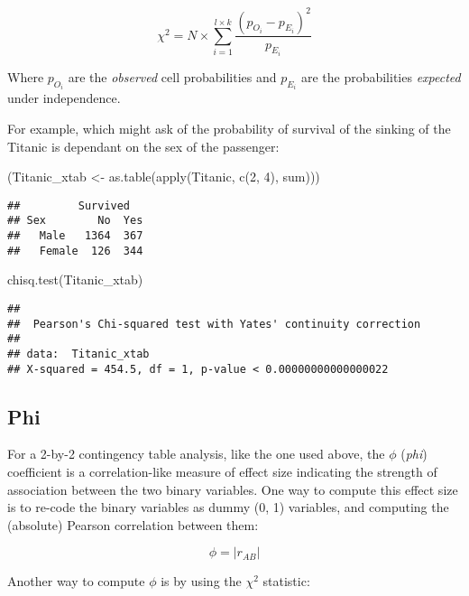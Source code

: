 \documentclass[
]{article}
\newenvironment{Shaded}{\begin{snugshade}}{\end{snugshade}}
\newcommand{\DecValTok}[1]{\textcolor[rgb]{0.00,0.00,0.81}{#1}}
\newcommand{\FunctionTok}[1]{\textcolor[rgb]{0.00,0.00,0.00}{#1}}
\newcommand{\NormalTok}[1]{#1}
\newcommand{\OtherTok}[1]{\textcolor[rgb]{0.56,0.35,0.01}{#1}}
\begin{document}
\[
\chi^2 = N\times\sum_{i=1}^{l\times k}{\frac{(p_{O_i}-p_{E_i})^2}{p_{E_i}}}
\]

Where \(p_{O_i}\) are the \emph{observed} cell probabilities and
\(p_{E_i}\) are the probabilities \emph{expected} under independence.

For example, which might ask of the probability of survival of the
sinking of the Titanic is dependant on the sex of the passenger:

\begin{Shaded}
\begin{Highlighting}[]
\NormalTok{(Titanic\_xtab }\OtherTok{\textless{}{-}} \FunctionTok{as.table}\NormalTok{(}\FunctionTok{apply}\NormalTok{(Titanic, }\FunctionTok{c}\NormalTok{(}\DecValTok{2}\NormalTok{, }\DecValTok{4}\NormalTok{), sum)))}
\end{Highlighting}
\end{Shaded}

\begin{verbatim}
##         Survived
## Sex        No  Yes
##   Male   1364  367
##   Female  126  344
\end{verbatim}

\begin{Shaded}
\begin{Highlighting}[]
\FunctionTok{chisq.test}\NormalTok{(Titanic\_xtab)}
\end{Highlighting}
\end{Shaded}

\begin{verbatim}
## 
##  Pearson's Chi-squared test with Yates' continuity correction
## 
## data:  Titanic_xtab
## X-squared = 454.5, df = 1, p-value < 0.00000000000000022
\end{verbatim}

\hypertarget{phi}{%
\subsection{Phi}\label{phi}}

For a 2-by-2 contingency table analysis, like the one used above, the
\(\phi\) (\emph{phi}) coefficient is a correlation-like measure of
effect size indicating the strength of association between the two
binary variables. One way to compute this effect size is to re-code the
binary variables as dummy (0, 1) variables, and computing the (absolute)
Pearson correlation between them:

\[
\phi = |r_{AB}|
\]

Another way to compute \(\phi\) is by using the \(\chi^2\) statistic:
\end{document}
